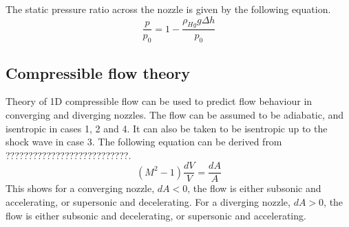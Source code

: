 \documentclass{article}
\begin{document}
The static pressure ratio across the nozzle is given by the following equation.
\begin{equation}
    \frac{p}{p_0} = 1 - \frac{\rho_{Hg} g \Delta h}{p_0}
\end{equation}

\subsection{Compressible flow theory}
Theory of 1D compressible flow can be used to predict flow behaviour in converging and diverging nozzles.
The flow can be assumed to be adiabatic, and isentropic in cases 1, 2 and 4.
It can also be taken to be isentropic up to the shock wave in case 3.
The following equation can be derived from ???????????????????????????.
\begin{equation}
    (M^2 - 1)\frac{dV}{V} = \frac{dA}{A}
\end{equation}
This shows for a converging nozzle, $dA < 0$, the flow is either subsonic and accelerating, or supersonic and decelerating.
For a diverging nozzle, $dA > 0$, the flow is either subsonic and decelerating, or supersonic and accelerating.
\end{document}
